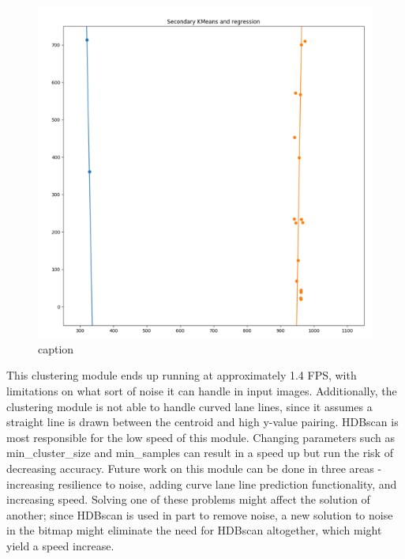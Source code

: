 \documentclass[twoside,twocolumn]{article}
\begin{document}
\begin{figure}
  \includegraphics[width=\linewidth]{daniel4.png}
  \caption{caption}
  \label{fig:d4}
\end{figure}

\par This clustering module ends up running at approximately 1.4 FPS, with limitations on what sort of noise it can handle in input images. Additionally, the clustering module is not able to handle curved lane lines, since it assumes a straight line is drawn between the centroid and high y-value pairing. HDBscan is most responsible for the low speed of this module. Changing parameters such as min\_cluster\_size and min\_samples can result in a speed up but run the risk of decreasing accuracy. Future work on this module can be done in three areas - increasing resilience to noise, adding curve lane line prediction functionality, and increasing speed. Solving one of these problems might affect the solution of another; since HDBscan is used in part to remove noise, a new solution to noise in the bitmap might eliminate the need for HDBscan altogether, which might yield a speed increase.
\end{document}
